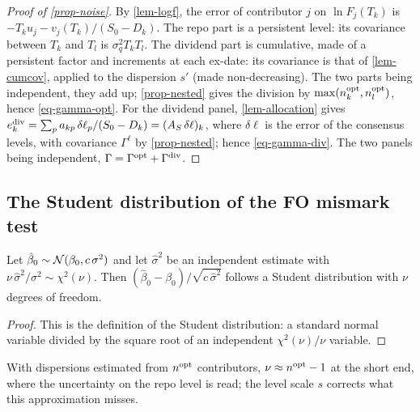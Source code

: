 \begin{proof}[Proof of \cref{prop-noise}]
By \cref{lem-logf}, the error of contributor $j$ on $\ln F_j(T_k)$ is $-T_ku_j-v_j(T_k)/(S_0-D_k)$. The repo part is a
persistent level: its covariance between $T_k$ and $T_l$ is $\sigma_q^2T_kT_l$. The dividend part is cumulative, made
of a persistent factor and increments at each ex-date: its covariance is that of \cref{lem-cumcov}, applied to the
dispersion $s'$ (made non-decreasing). The two parts being independent, they add up; \cref{prop-nested} gives the
division by $\max(n^{\mathrm{opt}}_k, n^{\mathrm{opt}}_l)$, hence \eqref{eq-gamma-opt}. For the dividend panel, \cref{lem-allocation}
gives $e^{\mathrm{div}}_k=\sum_pa_{kp}\,\delta\ell_p/(S_0-D_k)=(A_S\,\delta\ell)_k$, where $\delta\ell$ is the error of the
consensus levels, with covariance $\Gamma^\ell$ by \cref{prop-nested}; hence \eqref{eq-gamma-div}. The two panels being
independent, $\Gamma=\Gamma^{\mathrm{opt}}+\Gamma^{\mathrm{div}}$.
\end{proof}

\subsection{The Student distribution of the FO mismark test}\label{app-student}
\begin{lemma}
Let $\hat\beta_0\sim\mathcal{N}(\beta_0, c\,\sigma^2)$ and let $\hat\sigma^2$ be an independent estimate with
$\nu\,\hat\sigma^2/\sigma^2\sim\chi^2(\nu)$. Then $(\hat\beta_0-\beta_0)/\sqrt{c\,\hat\sigma^2}$ follows a Student
distribution with $\nu$ degrees of freedom.
\end{lemma}
\begin{proof}
This is the definition of the Student distribution: a standard normal variable divided by the square root of an
independent $\chi^2(\nu)/\nu$ variable.
\end{proof}
With dispersions estimated from $n^{\mathrm{opt}}$ contributors, $\nu\approx n^{\mathrm{opt}}-1$ at the short end, where the uncertainty
on the repo level is read; the level scale $s$ corrects what this approximation misses.

